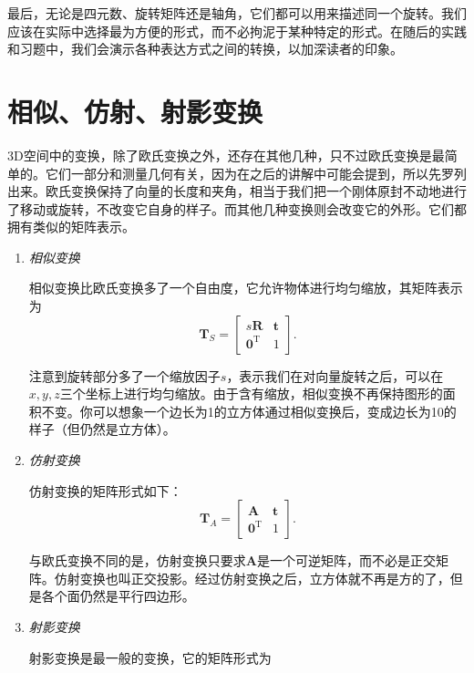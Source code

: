 最后，无论是四元数、旋转矩阵还是轴角，它们都可以用来描述同一个旋转。我们应该在实际中选择最为方便的形式，而不必拘泥于某种特定的形式。在随后的实践和习题中，我们会演示各种表达方式之间的转换，以加深读者的印象。

\section{\textsuperscript{\ttfamily *}相似、仿射、射影变换}
3D空间中的变换，除了欧氏变换之外，还存在其他几种，只不过欧氏变换是最简单的。它们一部分和测量几何有关，因为在之后的讲解中可能会提到，所以先罗列出来。欧氏变换保持了向量的长度和夹角，相当于我们把一个刚体原封不动地进行了移动或旋转，不改变它自身的样子。而其他几种变换则会改变它的外形。它们都拥有类似的矩阵表示。

\begin{enumerate}
	\item {\emph{相似变换}}
	
	相似变换比欧氏变换多了一个自由度，它允许物体进行均匀缩放，其矩阵表示为
	\begin{equation}
	\bm{T}_S = \left[ {\begin{array}{*{20}{c}}
		{s \bm{R}}& \bm{t}\\
		{{ \bm{0}^\mathrm{T}}}&1
		\end{array}} \right].
	\end{equation}
	
	注意到旋转部分多了一个缩放因子$s$，表示我们在对向量旋转之后，可以在$x,y,z$三个坐标上进行均匀缩放。由于含有缩放，相似变换不再保持图形的面积不变。你可以想象一个边长为1的立方体通过相似变换后，变成边长为10的样子（但仍然是立方体）。
	
	\item { \emph{仿射变换} }
	
	仿射变换的矩阵形式如下：
	\begin{equation}
	\bm{T}_A = \left[ {\begin{array}{*{20}{c}}
		\bm{A} & \bm{t}\\
		{{\bm{0}^\mathrm{T}}} & 1
		\end{array}} \right].
	\end{equation}
	
	与欧氏变换不同的是，仿射变换只要求$\bm{A}$是一个可逆矩阵，而不必是正交矩阵。仿射变换也叫正交投影。经过仿射变换之后，立方体就不再是方的了，但是各个面仍然是平行四边形。
	
	\item{ \emph{射影变换} }
	
	射影变换是最一般的变换，它的矩阵形式为
	

\end{enumerate}
